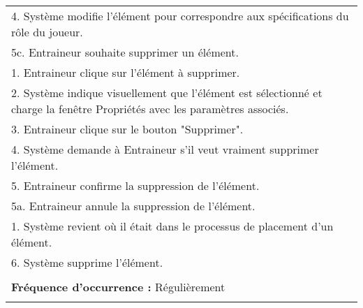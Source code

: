 \begin{longtable}{|p{16cm}|}
	\hspace{0.5cm}4. Système modifie l'élément pour correspondre aux spécifications du rôle du joueur.\\
	5c. Entraineur souhaite supprimer un élément.\\
	\hspace{0.5cm}1. Entraineur clique sur l'élément à supprimer.\\
	\hspace{0.5cm}2. Système indique visuellement que l'élément est sélectionné et charge la fenêtre Propriétés avec les paramètres associés.\\
	\hspace{0.5cm}3. Entraineur clique sur le bouton "Supprimer".\\
	\hspace{0.5cm}4. Système demande à Entraineur s'il veut vraiment supprimer l'élément.\\
	\hspace{0.5cm}5. Entraineur confirme la suppression de l'élément.\\
	\hspace{1cm}5a. Entraineur annule la suppression de l'élément.\\
	\hspace{1.5cm}1. Système revient où il était dans le processus de placement d'un élément.\\
	\hspace{1cm}6. Système supprime l'élément.\\
	\\
	\textbf{Fréquence d'occurrence :} Régulièrement\\
	\\
	\hline
\end{longtable}

